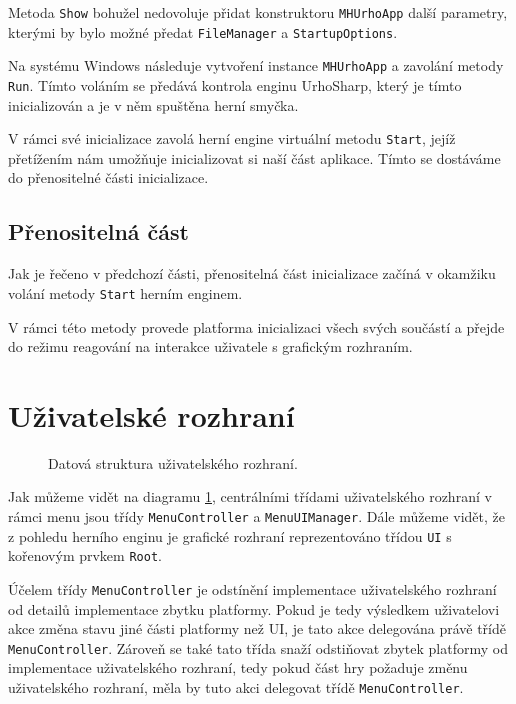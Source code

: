 Metoda \texttt{Show} bohužel nedovoluje přidat konstruktoru \texttt{MHUrhoApp} další parametry, kterými by bylo možné předat \texttt{FileManager} a \texttt{StartupOptions}.

Na systému Windows následuje vytvoření instance \texttt{MHUrhoApp} a zavolání metody \texttt{Run}. Tímto voláním se předává kontrola enginu UrhoSharp, který je tímto inicializován a je v něm spuštěna herní smyčka.

V rámci své inicializace zavolá herní engine virtuální metodu \texttt{Start}, jejíž přetížením nám umožňuje inicializovat si naší část aplikace. Tímto se dostáváme do přenositelné části inicializace.

\subsection{Přenositelná část}

Jak je řečeno v předchozí části, přenositelná část inicializace začíná v okamžiku volání metody \texttt{Start} herním enginem.

V rámci této metody provede platforma inicializaci všech svých součástí a přejde do režimu reagování na interakce uživatele s grafickým rozhraním.


\section{Uživatelské rozhraní}

\begin{figure}[h]
	\centering
	\fontsize{8pt}{11pt}\selectfont
	\def\svgwidth{\textwidth}
	
	\caption{Datová struktura uživatelského rozhraní.}
	\label{fig:uireferences}
\end{figure}

Jak můžeme vidět na diagramu \ref{fig:uireferences}, centrálními třídami uživatelského rozhraní v rámci menu jsou třídy \texttt{MenuController} a \texttt{MenuUIManager}. Dále můžeme vidět, že z pohledu herního enginu je grafické rozhraní reprezentováno třídou \texttt{UI} s kořenovým prvkem \texttt{Root}.

Účelem třídy \texttt{MenuController} je odstínění implementace uživatelského rozhraní od detailů implementace zbytku platformy. Pokud je tedy výsledkem uživatelovi akce změna stavu jiné části platformy než UI, je tato akce delegována právě třídě \texttt{MenuController}. Zároveň se také tato třída snaží odstiňovat zbytek platformy od implementace uživatelského rozhraní, tedy pokud část hry požaduje změnu uživatelského rozhraní, měla by tuto akci delegovat třídě \texttt{MenuController}.

